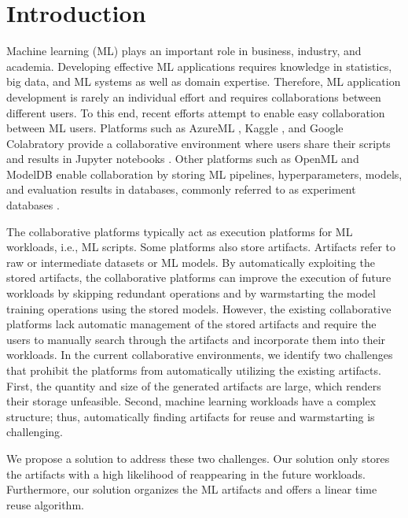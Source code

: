 \section{Introduction} \label{sec-introduction}
Machine learning (ML) plays an important role in business, industry, and academia. 
Developing effective ML applications requires knowledge in statistics, big data, and ML systems as well as domain expertise.
Therefore, ML application development is rarely an individual effort and requires collaborations between different users.
To this end, recent efforts attempt to enable easy collaboration between ML users.
Platforms such as AzureML \cite{team2016azureml}, Kaggle \cite{kagglewebsite}, and Google Colabratory \cite{googlecolab} provide a collaborative environment where users share their scripts and results in Jupyter notebooks \cite{Kluyver:2016aa}.
Other platforms such as OpenML \cite{vanschoren2014openml} and ModelDB \cite{vartak2016m} enable collaboration by storing ML pipelines, hyperparameters, models, and evaluation results in databases, commonly referred to as experiment databases \cite{Vanschoren2012}.

The collaborative platforms typically act as execution platforms for ML workloads, i.e., ML scripts.
Some platforms also store artifacts.
Artifacts refer to raw or intermediate datasets or ML models.
By automatically exploiting the stored artifacts, the collaborative platforms can improve the execution of future workloads by skipping redundant operations and by warmstarting the model training operations using the stored models.
However, the existing collaborative platforms lack automatic management of the stored artifacts and require the users to manually search through the artifacts and incorporate them into their workloads.
In the current collaborative environments, we identify two challenges that prohibit the platforms from automatically utilizing the existing artifacts.
First, the quantity and size of the generated artifacts are large, which renders their storage unfeasible.
Second, machine learning workloads have a complex structure; thus, automatically finding artifacts for reuse and warmstarting is challenging.

We propose a solution to address these two challenges.
Our solution only stores the artifacts with a high likelihood of reappearing in the future workloads.
Furthermore, our solution organizes the ML artifacts and offers a linear time reuse algorithm.

